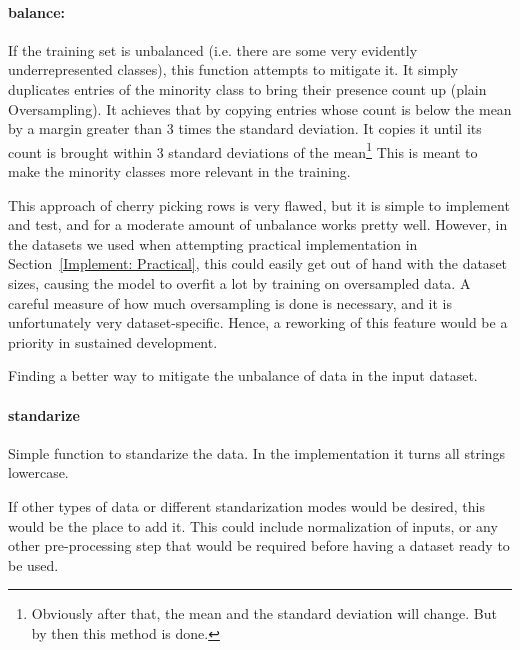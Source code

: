 \documentclass[a4paper, 11pt]{report}
\begin{document}
    \paragraph{balance:} If the training set is unbalanced (i.e. there are some very evidently underrepresented classes), this function attempts to mitigate it. It simply duplicates entries of the minority class to bring their presence count up (plain Oversampling). It achieves that by copying entries whose count is below the mean by a margin greater than 3 times the standard deviation. It copies it until its count is brought within 3 standard deviations of the mean\footnote{Obviously after that, the mean and the standard deviation will change. But by then this method is done.}
    This is meant to make the minority classes more relevant in the training.
    \begin{tcolorbox}[title=Rework candidate: Approach to data unbalance , colback=white,colframe=blue!50!black]
    This approach of cherry picking rows is very flawed, but it is simple to implement and test, and for a moderate amount of unbalance works pretty well. However, in the datasets we used when attempting practical implementation in Section~\ref{Implement: Practical}, this could easily get out of hand with the dataset sizes, causing the model to overfit a lot by training on oversampled data. A careful measure of how much oversampling is done is necessary, and it is unfortunately very dataset-specific. Hence, a reworking of this feature would be a priority in sustained development.
        \begin{tcolorbox}[title=Future Development: A better handling of unbalanced datasets, colback=white,colframe=green!40!black]
        Finding a better way to mitigate the unbalance of data in the input dataset.
        \end{tcolorbox}
    \end{tcolorbox}


    \paragraph{standarize} Simple function to standarize the data. In the implementation it turns all strings lowercase.
    \begin{tcolorbox}[title=Future Development: Different kinds of standarization, colback=white,colframe=green!40!black]
         If other types of data or different standarization modes would be desired, this would be the place to add it. This could include normalization of inputs, or any other pre-processing step that would be required before having a dataset ready to be used.
    \end{tcolorbox}
\end{document}

